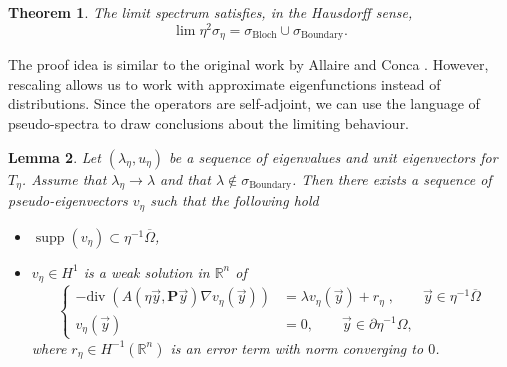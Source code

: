 \documentclass[a4paper,reqno]{amsart}
\numberwithin{equation}{section}
\numberwithin{equation}{section}		%
\numberwithin{figure}{section}			%
\numberwithin{table}{section}				%
\newcommand{\R}{\mathbb{R}}
\newtheorem{theorem}{Theorem}[section]
\newtheorem{lemma}[theorem]{Lemma}
\theoremstyle{definition}
\renewcommand{\bar}[1]{\overline{#1}}
\newcommand{\<}{\ensuremath \leq}
\renewcommand{\>}{\ensuremath \geq}
\begin{document}
\begin{theorem}\label{thm: SpectralLimit}
    The limit spectrum satisfies, in the Hausdorff sense,
    \begin{equation}        \lim\eta^{2}\sigma_\eta=\sigma_{\text{Bloch}}\cup\sigma_{\text{Boundary}}.
    \end{equation}
\end{theorem}
The proof idea is similar to the original work by Allaire and Conca \cite{allaire1998bloch}. However, rescaling allows us to work with approximate eigenfunctions instead of distributions. Since the operators are self-adjoint, we can use the language of pseudo-spectra to draw conclusions about the limiting behaviour.
\begin{lemma}\label{lem: PseudoeigenvectorsGeneral}
    Let $(\lambda_\eta, u_\eta)$ be a sequence of eigenvalues and unit eigenvectors for $T_\eta$. Assume that $\lambda_\eta\rightarrow\lambda$ and that $\lambda\notin \sigma_{\text{Boundary}}$. Then there exists a sequence of pseudo-eigenvectors $v_\eta$ such that the following hold
    \begin{itemize}
        \item $\operatorname{supp}(v_\eta)\subset\eta^{-1}\bar{\Omega}$,
        \item $v_\eta\in H^{1}$ is a weak solution in $\mathbb{R}^n$ of 
         \begin{equation} 
            \left\{
                \begin{aligned}
                    - \mathrm{div} \; \left( A\left( \eta \vec{y}, \textbf{P} \vec{y} \right) \nabla v_\eta({\vec y}) \right )& = \lambda v_\eta(\vec{y})+r_\eta \;, \qquad \vec{y} \in \eta^{-1}\bar{\Omega} \\
                    v_\eta(\vec{y})& = 0,\qquad \vec{y}\in\partial\eta^{-1}\Omega,
                \end{aligned}
            \right.
        \end{equation}
        where $r_\eta\in H^{-1}(\R^n)$ is an error term with norm converging to $0$.
    \end{itemize}
\end{lemma}
\end{document}
